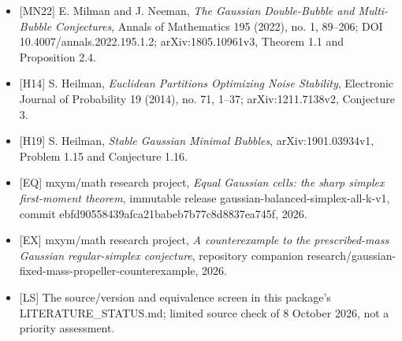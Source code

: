 \documentclass[
  11pt,
]{article}
\providecommand{\tightlist}{%
  \setlength{\itemsep}{0pt}\setlength{\parskip}{0pt}}
\begin{document}
\begin{itemize}
\tightlist
\item
  {[}MN22{]} E. Milman and J. Neeman, \emph{The Gaussian Double-Bubble
  and Multi-Bubble Conjectures}, Annals of Mathematics 195 (2022), no.
  1, 89--206; DOI 10.4007/annals.2022.195.1.2; arXiv:1805.10961v3,
  Theorem 1.1 and Proposition 2.4.
\item
  {[}H14{]} S. Heilman, \emph{Euclidean Partitions Optimizing Noise
  Stability}, Electronic Journal of Probability 19 (2014), no. 71,
  1--37; arXiv:1211.7138v2, Conjecture 3.
\item
  {[}H19{]} S. Heilman, \emph{Stable Gaussian Minimal Bubbles},
  arXiv:1901.03934v1, Problem 1.15 and Conjecture 1.16.
\item
  {[}EQ{]} mxym/math research project, \emph{Equal Gaussian cells: the
  sharp simplex first-moment theorem}, immutable release
  gaussian-balanced-simplex-all-k-v1, commit
  ebfd90558439afca21babeb7b77c8d8837ea745f, 2026.
\item
  {[}EX{]} mxym/math research project, \emph{A counterexample to the
  prescribed-mass Gaussian regular-simplex conjecture}, repository
  companion research/gaussian-fixed-mass-propeller-counterexample, 2026.
\item
  {[}LS{]} The source/version and equivalence screen in this package's
  LITERATURE\_STATUS.md; limited source check of 8 October 2026, not a
  priority assessment.
\end{itemize}
\end{document}
